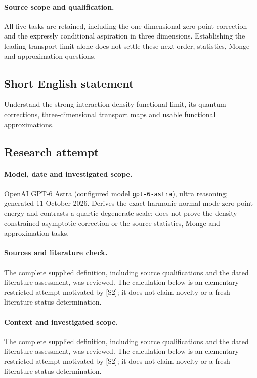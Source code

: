 \documentclass[11pt]{article}
\begin{document}
\paragraph{Source scope and qualification.}
All five tasks are retained, including the one-dimensional zero-point correction and the expressly conditional aspiration in three dimensions. Establishing the leading transport limit alone does not settle these next-order, statistics, Monge and approximation questions.
\subsection{Short English statement}
Understand the strong-interaction density-functional limit, its quantum corrections, three-dimensional transport maps and usable functional approximations.
\subsection{Research attempt}
\paragraph{Model, date and investigated scope.}
OpenAI GPT-6 Astra (configured model \texttt{gpt-6-astra}), ultra reasoning; generated 11 October 2026. Derives the exact harmonic normal-mode zero-point energy and contrasts a quartic degenerate scale; does not prove the density-constrained asymptotic correction or the source statistics, Monge and approximation tasks.

\paragraph{Sources and literature check.}
The complete supplied definition, including source qualifications and the dated literature assessment, was reviewed. The calculation below is an elementary restricted attempt motivated by [S2]; it does not claim novelty or a fresh literature-status determination.

\paragraph{Context and investigated scope.} The complete supplied definition, including source qualifications and the dated literature assessment, was reviewed. The calculation below is an elementary restricted attempt motivated by [S2]; it does not claim novelty or a fresh literature-status determination.
\end{document}
